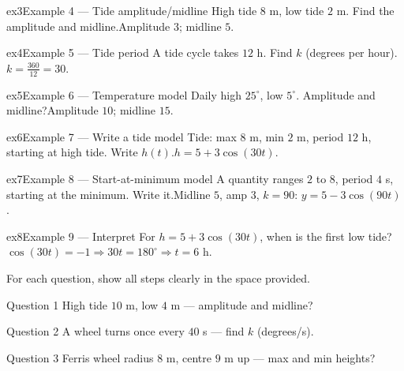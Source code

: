 \documentclass[11pt]{article}
\begin{document}
\begin{example}{ex3}{Example 4 --- Tide amplitude/midline}
High tide $8$ m, low tide $2$ m. Find the amplitude and midline.\soln Amplitude $3$; midline $5$.
\end{example}

\begin{example}{ex4}{Example 5 --- Tide period}
A tide cycle takes $12$ h. Find $k$ (degrees per hour).\soln $k=\tfrac{360}{12}=30$.
\end{example}

\begin{example}{ex5}{Example 6 --- Temperature model}
Daily high $25^\circ$, low $5^\circ$. Amplitude and midline?\soln Amplitude $10$; midline $15$.
\end{example}

\begin{example}{ex6}{Example 7 --- Write a tide model}
Tide: max $8$ m, min $2$ m, period $12$ h, starting at high tide. Write $h(t)$.\soln $h=5+3\cos(30t)$.
\end{example}

\begin{example}{ex7}{Example 8 --- Start-at-minimum model}
A quantity ranges $2$ to $8$, period $4$ s, starting at the minimum. Write it.\soln Midline $5$, amp $3$, $k=90$: $y=5-3\cos(90t)$.
\end{example}

\begin{example}{ex8}{Example 9 --- Interpret}
For $h=5+3\cos(30t)$, when is the first low tide?\soln $\cos(30t)=-1\Rightarrow 30t=180^\circ\Rightarrow t=6$ h.
\end{example}

\clearpage
{}
For each question, show all steps clearly in the space provided.

\begin{qbox}{Question 1}
High tide $10$ m, low $4$ m — amplitude and midline?\workspace{2.4cm}
\end{qbox}

\begin{qbox}{Question 2}
A wheel turns once every $40$ s — find $k$ (degrees/s).\workspace{2.4cm}
\end{qbox}

\begin{qbox}{Question 3}
Ferris wheel radius $8$ m, centre $9$ m up — max and min heights?\workspace{2.4cm}
\end{qbox}
\end{document}
